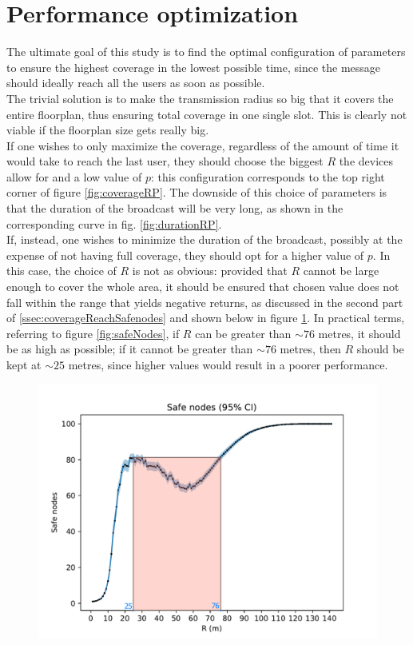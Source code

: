 \section{Performance optimization}
The ultimate goal of this study is to find the optimal configuration of
parameters to ensure the highest coverage in the lowest possible time, since
the message should ideally reach all the users as soon as possible.\\
The trivial solution is to make the transmission radius so big that it covers
the entire floorplan, thus ensuring total coverage in one single slot.
This is clearly not viable if the floorplan size gets really big.\\
If one wishes to only maximize the coverage, regardless of the amount of time
it would take to reach the last user, they should choose the biggest $R$ the
devices allow for and a low value of $p$: this configuration corresponds to the
top right corner of figure \ref{fig:coverageRP}. The downside of this choice of
parameters is that the duration of the broadcast will be very long, as shown in
the corresponding curve in fig. \ref{fig:durationRP}.\\
If, instead, one wishes to minimize the duration of the broadcast, possibly at
the expense of not having full coverage, they should opt for a higher value of
$p$. In this case, the choice of $R$ is not as obvious: provided that $R$ cannot
be large enough to cover the whole area, it should be ensured that chosen value
does not fall within the range that yields negative returns, as discussed in
the second part of \ref{ssec:coverageReachSafenodes} and shown below in figure
\ref{fig:safeNodesShaded}. In practical terms, referring to figure
\ref{fig:safeNodes}, if $R$ can be greater than $\sim76$ metres, it should be
as high as possible; if it cannot be greater than $\sim76$ metres, then $R$
should be kept at $\sim25$ metres, since higher values would result in a poorer
performance.
\begin{figure}[H]
    \begin{center}
        \includegraphics[scale=0.7]{img/graphAnalysisSafe_nodesRed.png}
        \caption{}
        \label{fig:safeNodesShaded}
    \end{center}
\end{figure}
